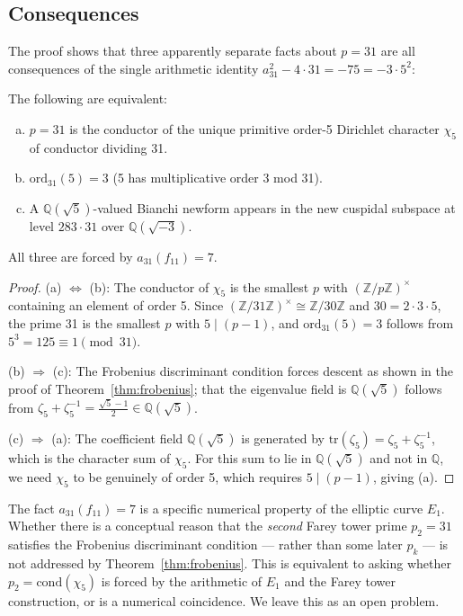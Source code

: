 \subsection{Consequences}
\label{subsec:consequences}

The proof shows that three apparently separate facts about $p = 31$
are all consequences of the single arithmetic identity
$a_{31}^2 - 4 \cdot 31 = -75 = -3 \cdot 5^2$:

\begin{corollary}
\label{cor:triple-coincidence}
The following are equivalent:
\begin{enumerate}[(a)]
  \item $p = 31$ is the conductor of the unique primitive order-5
        Dirichlet character $\chi_5$ of conductor dividing 31.
  \item $\mathrm{ord}_{31}(5) = 3$ (5 has multiplicative order 3 mod 31).
  \item A $\mathbb{Q}(\sqrt{5})$-valued Bianchi newform appears in the
        new cuspidal subspace at level $283 \cdot 31$ over $\mathbb{Q}(\sqrt{-3})$.
\end{enumerate}
All three are forced by $a_{31}(f_{11}) = 7$.
\end{corollary}

\begin{proof}
(a) $\Leftrightarrow$ (b): The conductor of $\chi_5$ is the smallest $p$
with $(\mathbb{Z}/p\mathbb{Z})^\times$ containing an element of order 5.
Since $(\mathbb{Z}/31\mathbb{Z})^\times \cong \mathbb{Z}/30\mathbb{Z}$
and $30 = 2 \cdot 3 \cdot 5$, the prime 31 is the smallest $p$ with
$5 \mid (p-1)$, and $\mathrm{ord}_{31}(5) = 3$ follows from $5^3 = 125
\equiv 1 \pmod{31}$.

(b) $\Rightarrow$ (c): The Frobenius discriminant condition forces descent
as shown in the proof of Theorem~\ref{thm:frobenius}; that the eigenvalue
field is $\mathbb{Q}(\sqrt{5})$ follows from $\zeta_5 + \zeta_5^{-1} =
\frac{\sqrt{5}-1}{2} \in \mathbb{Q}(\sqrt{5})$.

(c) $\Rightarrow$ (a): The coefficient field $\mathbb{Q}(\sqrt{5})$
is generated by $\mathrm{tr}(\zeta_5) = \zeta_5 + \zeta_5^{-1}$,
which is the character sum of $\chi_5$. For this sum to lie in
$\mathbb{Q}(\sqrt{5})$ and not in $\mathbb{Q}$, we need $\chi_5$
to be genuinely of order 5, which requires $5 \mid (p-1)$, giving (a).
\end{proof}

\begin{remark}
\label{rem:open}
The fact $a_{31}(f_{11}) = 7$ is a specific numerical property of the
elliptic curve $E_1$. Whether there is a conceptual reason that the
\emph{second} Farey tower prime $p_2 = 31$ satisfies the Frobenius
discriminant condition --- rather than some later $p_k$ --- is not
addressed by Theorem~\ref{thm:frobenius}. This is equivalent to asking
whether $p_2 = \mathrm{cond}(\chi_5)$ is forced by the arithmetic of
$E_1$ and the Farey tower construction, or is a numerical coincidence.
We leave this as an open problem.
\end{remark}

